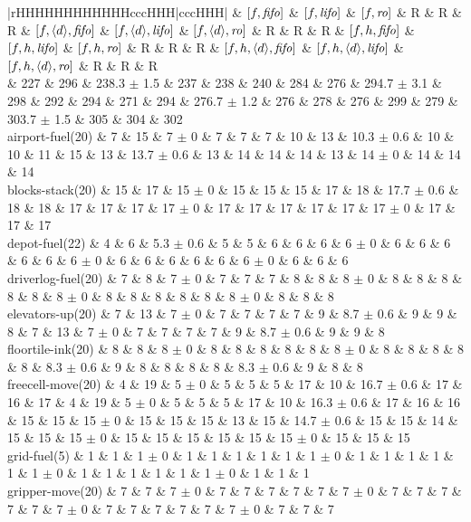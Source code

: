 \begin{center}
\begin{tabular}{|rHHHHHHHHHHHHcccHHH|cccHHH|}
 & $[f,{\text{\textit{fifo}}}]$ & $[f,{\text{\textit{lifo}}}]$ & $[f,{\text{\textit{ro}}}]$ & R & R & R & $[f,{\left<d\right>},{\text{\textit{fifo}}}]$ & $[f,{\left<d\right>},{\text{\textit{lifo}}}]$ & $[f,{\left<d\right>},{\text{\textit{ro}}}]$ & R & R & R & $[f,h,{\text{\textit{fifo}}}]$ & $[f,h,{\text{\textit{lifo}}}]$ & $[f,h,{\text{\textit{ro}}}]$ & R & R & R & $[f,h,{\left<d\right>},{\text{\textit{fifo}}}]$ & $[f,h,{\left<d\right>},{\text{\textit{lifo}}}]$ & $[f,h,{\left<d\right>},{\text{\textit{ro}}}]$ & R & R & R\\
\hline
 & 227 & 296 & 238.3 $\pm$ 1.5 & 237 & 238 & 240 & 284 & 276 & 294.7 $\pm$ 3.1 & 298 & 292 & 294 & 271 & 294 & 276.7 $\pm$ 1.2 & 276 & 278 & 276 & 299 & 279 & 303.7 $\pm$ 1.5 & 305 & 304 & 302\\
\hline
airport-fuel(20) & 7 & 15 & 7 $\pm$ 0 & 7 & 7 & 7 & 10 & 13 & 10.3 $\pm$ 0.6 & 10 & 10 & 11 & 15 & 13 & 13.7 $\pm$ 0.6 & 13 & 14 & 14 & 14 & 13 & 14 $\pm$ 0 & 14 & 14 & 14\\
blocks-stack(20) & 15 & 17 & 15 $\pm$ 0 & 15 & 15 & 15 & 17 & 18 & 17.7 $\pm$ 0.6 & 18 & 18 & 17 & 17 & 17 & 17 $\pm$ 0 & 17 & 17 & 17 & 17 & 17 & 17 $\pm$ 0 & 17 & 17 & 17\\
depot-fuel(22) & 4 & 6 & 5.3 $\pm$ 0.6 & 5 & 5 & 6 & 6 & 6 & 6 $\pm$ 0 & 6 & 6 & 6 & 6 & 6 & 6 $\pm$ 0 & 6 & 6 & 6 & 6 & 6 & 6 $\pm$ 0 & 6 & 6 & 6\\
driverlog-fuel(20) & 7 & 8 & 7 $\pm$ 0 & 7 & 7 & 7 & 8 & 8 & 8 $\pm$ 0 & 8 & 8 & 8 & 8 & 8 & 8 $\pm$ 0 & 8 & 8 & 8 & 8 & 8 & 8 $\pm$ 0 & 8 & 8 & 8\\
elevators-up(20) & 7 & 13 & 7 $\pm$ 0 & 7 & 7 & 7 & 7 & 9 & 8.7 $\pm$ 0.6 & 9 & 9 & 8 & 7 & 13 & 7 $\pm$ 0 & 7 & 7 & 7 & 7 & 9 & 8.7 $\pm$ 0.6 & 9 & 9 & 8\\
floortile-ink(20) & 8 & 8 & 8 $\pm$ 0 & 8 & 8 & 8 & 8 & 8 & 8 $\pm$ 0 & 8 & 8 & 8 & 8 & 8 & 8.3 $\pm$ 0.6 & 9 & 8 & 8 & 8 & 8 & 8.3 $\pm$ 0.6 & 9 & 8 & 8\\
freecell-move(20) & 4 & 19 & 5 $\pm$ 0 & 5 & 5 & 5 & 17 & 10 & 16.7 $\pm$ 0.6 & 17 & 16 & 17 & 4 & 19 & 5 $\pm$ 0 & 5 & 5 & 5 & 17 & 10 & 16.3 $\pm$ 0.6 & 17 & 16 & 16\\
 & 15 & 15 & 15 $\pm$ 0 & 15 & 15 & 15 & 13 & 15 & 14.7 $\pm$ 0.6 & 15 & 15 & 14 & 15 & 15 & 15 $\pm$ 0 & 15 & 15 & 15 & 15 & 15 & 15 $\pm$ 0 & 15 & 15 & 15\\
grid-fuel(5) & 1 & 1 & 1 $\pm$ 0 & 1 & 1 & 1 & 1 & 1 & 1 $\pm$ 0 & 1 & 1 & 1 & 1 & 1 & 1 $\pm$ 0 & 1 & 1 & 1 & 1 & 1 & 1 $\pm$ 0 & 1 & 1 & 1\\
gripper-move(20) & 7 & 7 & 7 $\pm$ 0 & 7 & 7 & 7 & 7 & 7 & 7 $\pm$ 0 & 7 & 7 & 7 & 7 & 7 & 7 $\pm$ 0 & 7 & 7 & 7 & 7 & 7 & 7 $\pm$ 0 & 7 & 7 & 7\\

\end{tabular}
\end{center}
